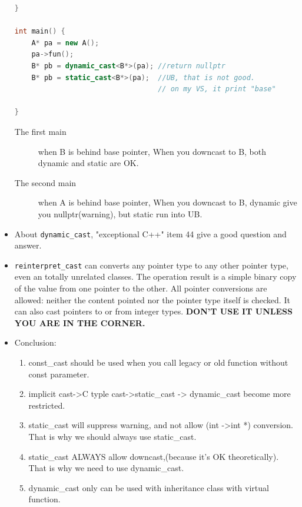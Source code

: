 \documentclass[a4paper,11pt,twoside]{book}
\begin{document}
\begin{itemize}
\begin{lstlisting}[frame=single, language=c++, mathescape=true]
}

int main() {
	A* pa = new A();
	pa->fun();
	B* pb = dynamic_cast<B*>(pa); //return nullptr
	B* pb = static_cast<B*>(pa);  //UB, that is not good.
								  // on my VS, it print "base"
							
}
\end{lstlisting}
\begin{description}
	\item[The first main] when B is behind base pointer, When you downcast to B, both dynamic and static are OK.
	\item[The second main]  when A is behind base pointer, When you downcast to B, dynamic give you nullptr(warning), but static run into UB.	
\end{description}


	\item About \texttt{dynamic\_cast}, "exceptional C++" item 44 give a good question and answer.
	
	\item \texttt{reinterpret\_cast} can converts any pointer type to any other pointer type, even an totally unrelated classes. The operation result is a simple binary copy of the value from one pointer to the other. All pointer conversions are allowed: neither the content pointed nor the pointer type itself is checked. It can also cast pointers to or from integer types. \textbf{DON'T USE IT UNLESS YOU ARE IN THE CORNER.}
	
	\item Conclusion:
\begin{enumerate}
	\item const\_cast should be used when you call legacy or old function without const parameter. 
	
	\item implicit cast->C typle cast->static\_cast -> dynamic\_cast become more restricted.
	
	\item static\_cast will suppress warning, and not allow (int ->int *) conversion. That is why we should always use static\_cast. 
	
	\item static\_cast ALWAYS allow downcast,(because it's OK theoretically). That is why we need to use dynamic\_cast.
	
	\item dynamic\_cast only can be used with inheritance class with virtual function. 
\end{enumerate}
	
\end{itemize}
\end{document}
